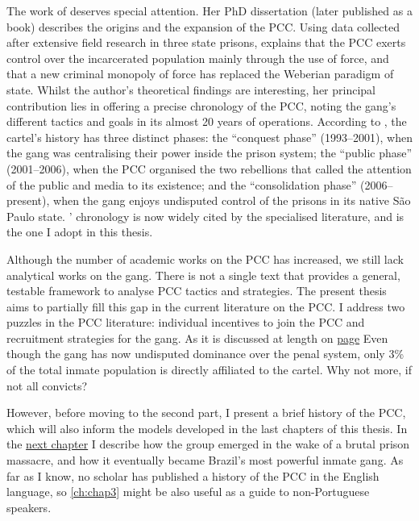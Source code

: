 The work of \citet{dias2011pulverizaccao} deserves special attention. Her PhD dissertation (later published as a book) describes the origins and the expansion of the PCC. Using data collected after extensive field research in three state prisons, \citeauthor{dias2011pulverizaccao} explains that the PCC exerts control over the incarcerated population mainly through the use of force, and that a new criminal monopoly of force has replaced the Weberian paradigm of state. Whilst the author's theoretical findings are interesting, her principal contribution lies in offering a precise chronology of the PCC, noting the gang's different tactics and goals in its almost 20 years of operations. According to \citeauthor{dias2011pulverizaccao}, the cartel's history has three distinct phases: the ``conquest phase'' (1993--2001), when the gang was centralising their power inside the prison system; the ``public phase'' (2001--2006), when the PCC organised the two rebellions that called the attention of the public and media to its existence; and the ``consolidation phase'' (2006--present), when the gang enjoys undisputed control of the prisons in its native S\~{a}o Paulo state. \citeauthor{dias2011pulverizaccao}' chronology is now widely cited by the specialised literature, and is the one I adopt in this thesis. 

Although the number of academic works on the PCC has increased, we still lack analytical works on the gang. There is not a single text that provides a general, testable framework to analyse PCC tactics and strategies. The present thesis aims to partially fill this gap in the current literature on the PCC. I address two puzzles in the PCC literature: individual incentives to join the PCC and recruitment strategies for the gang. As it is discussed at length on \hyperlink{page.41}{page} Even though the gang has now undisputed dominance over the penal system, only 3\% of the total inmate population is directly affiliated to the cartel. Why not more, if not all convicts? %

However, before moving to the second part, I present a brief history of the PCC, which will also inform the models developed in the last chapters of this thesis. In the \hyperlink{page.19}{next chapter} I describe how the group emerged in the wake of a brutal prison massacre, and how it eventually became Brazil's most powerful inmate gang. As far as I know, no scholar has published a history of the PCC in the English language, so \autoref{ch:chap3} might be also useful as a guide to non-Portuguese speakers.



